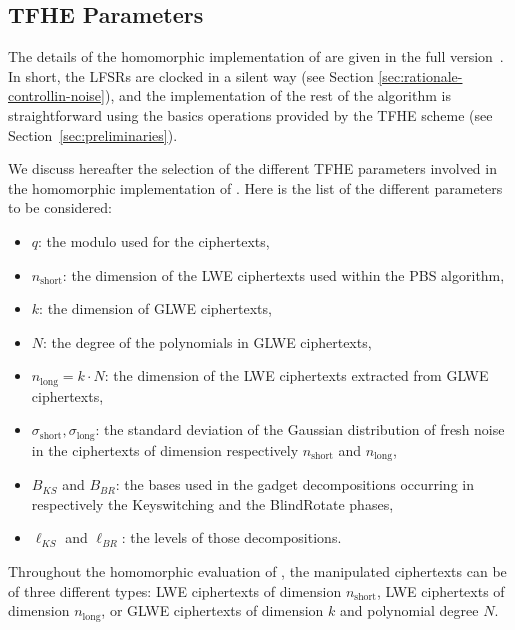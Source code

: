 \subsection{TFHE Parameters} 
\label{sec:tfhe-parameters}

\ifeprint
\else
	The details of the homomorphic implementation of \coolName{} are given in the full version~\cite{EPRINT:BBBBCL25}. In short, the LFSRs are clocked in a silent way (see Section \ref{sec:rationale-controllin-noise}), and the implementation of the rest of the algorithm is straightforward using the basics operations provided by the TFHE scheme (see Section~\ref{sec:preliminaries}). 
\fi

We discuss hereafter the selection of the different TFHE parameters involved in the homomorphic implementation of \coolName. Here is the list of the different parameters to be considered:
\begin{itemize}
	\item $q$: the modulo used for the ciphertexts,
	\item $n_{\text{short}}$: the dimension of the LWE ciphertexts used within the PBS algorithm,
	\item $k$: the dimension of GLWE ciphertexts,
	\item $N$: the degree of the polynomials in GLWE ciphertexts,
	\item $n_{\text{long}} = k \cdot N$: the dimension of the LWE ciphertexts extracted from GLWE ciphertexts,
	\item $\sigma_{\text{short}}, \sigma_{\text{long}}$: the standard deviation of the Gaussian distribution of fresh noise in the ciphertexts of dimension respectively $n_{\text{short}}$ and  $n_{\text{long}}$,
	\item $B_{KS}$ and $B_{BR}$: the bases used in the gadget decompositions occurring in respectively the \textsf{Keyswitching} and the \textsf{BlindRotate} phases,
	\item $\ell_{KS}$ and $\ell_{BR}$: the levels of those decompositions.
\end{itemize}

Throughout the homomorphic evaluation of \coolName, the manipulated ciphertexts can be of three different types: LWE ciphertexts of dimension $n_{\text{short}}$, LWE ciphertexts of dimension $n_{\text{long}}$, or GLWE ciphertexts of dimension $k$ and polynomial degree $N$. 
\else %

